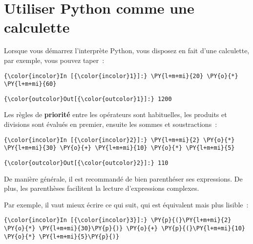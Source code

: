     
    
    
    

    

    \hypertarget{utiliser-python-comme-une-calculette}{%
\section{Utiliser Python comme une
calculette}\label{utiliser-python-comme-une-calculette}}

    Lorsque vous démarrez l'interprète Python, vous disposez en fait d'une
calculette, par exemple, vous pouvez taper~:

    \begin{Verbatim}[commandchars=\\\{\}]
{\color{incolor}In [{\color{incolor}1}]:} \PY{l+m+mi}{20} \PY{o}{*} \PY{l+m+mi}{60}
\end{Verbatim}


\begin{Verbatim}[commandchars=\\\{\}]
{\color{outcolor}Out[{\color{outcolor}1}]:} 1200
\end{Verbatim}
            
    Les règles de \textbf{priorité} entre les opérateurs sont habituelles,
les produits et divisions sont évalués en premier, ensuite les sommes et
soustractions~:

    \begin{Verbatim}[commandchars=\\\{\}]
{\color{incolor}In [{\color{incolor}2}]:} \PY{l+m+mi}{2} \PY{o}{*} \PY{l+m+mi}{30} \PY{o}{+} \PY{l+m+mi}{10} \PY{o}{*} \PY{l+m+mi}{5}
\end{Verbatim}


\begin{Verbatim}[commandchars=\\\{\}]
{\color{outcolor}Out[{\color{outcolor}2}]:} 110
\end{Verbatim}
            
    De manière générale, il est recommandé de bien parenthéser ses
expressions. De plus, les parenthèses facilitent la lecture
d'expressions complexes.

Par exemple, il vaut mieux écrire ce qui suit, qui est équivalent mais
plus lisible~:

    \begin{Verbatim}[commandchars=\\\{\}]
{\color{incolor}In [{\color{incolor}3}]:} \PY{p}{(}\PY{l+m+mi}{2} \PY{o}{*} \PY{l+m+mi}{30}\PY{p}{)} \PY{o}{+} \PY{p}{(}\PY{l+m+mi}{10} \PY{o}{*} \PY{l+m+mi}{5}\PY{p}{)}
\end{Verbatim}


